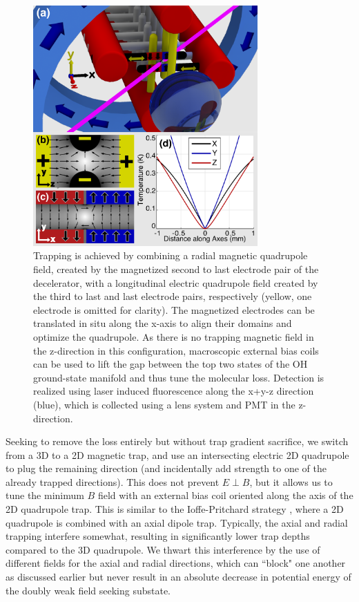 \documentclass[%
 reprint,
 amsmath,amssymb,
 aps,
prl,
]{revtex4-1}
\begin{document}
\begin{figure}
\includegraphics[width=86mm]{Geometry/CAD_recolor_laser_panels.PNG}%
\caption{
Trapping is achieved by combining a radial magnetic quadrupole field, created by the magnetized second to last electrode pair of the decelerator, with a longitudinal electric quadrupole field created by the third to last and last electrode pairs, respectively (yellow, one electrode is omitted for clarity). The magnetized electrodes can be translated in situ along the x-axis to align their domains and optimize the quadrupole. As there is no trapping magnetic field in the z-direction in this configuration, macroscopic external bias coils can be used to lift the gap between the top two states of the OH ground-state manifold and thus tune the molecular loss. Detection is realized using laser induced fluorescence along the x+y-z direction (blue), which is collected using a lens system and PMT in the z-direction.
\label{fig:CAD}}
\end{figure}

Seeking to remove the loss entirely but without trap gradient sacrifice, we switch from a 3D to a 2D magnetic trap, and use an intersecting electric 2D quadrupole to plug the remaining direction (and incidentally add strength to one of the already trapped directions). This does not prevent $E\!\perp\! B$, but it allows us to tune the minimum $B$ field with an external bias coil oriented along the axis of the 2D quadrupole trap. This is similar to the Ioffe-Pritchard strategy \cite{pritchard1983}, where a 2D quadrupole is combined with an axial dipole trap. Typically, the axial and radial trapping interfere somewhat, resulting in significantly lower trap depths compared to the 3D quadrupole. We thwart this interference by the use of different fields for the axial and radial directions, which can ``block" one another as discussed earlier but never result in an absolute decrease in potential energy of the doubly weak field seeking substate. 
\end{document}
